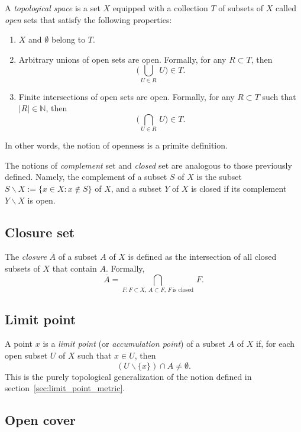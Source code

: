\documentclass[aps,prl,twocolumn,groupedaddress]{revtex4-2}
\newcommand{\NN}{\mathbb{N}}
\begin{document}

A {\em topological space} is a set $X$ equipped with a collection $T$ of subsets of $X$ called {\em open} sets that satisfy the following properties:
\begin{enumerate}
\item
$X$ and $\emptyset$ belong to $T$.
\item
Arbitrary unions of open sets are open.
Formally, for any $R\subset T$, then 
$$
\bigg( \bigcup_{U\in R}\, U \bigg) \in T.
$$
\item
Finite intersections of open sets are open.
Formally, for any $R\subset T$ such that $|R|\in \NN$, then
$$
\bigg( \bigcap_{U\in R}\, U \bigg) \in T.
$$
\end{enumerate}
In other words, the notion of openness is a primite definition.

The notions of {\em complement} set and {\em closed} set are analogous to those previously defined.
Namely, the complement of a subset $S$ of $X$ is the subset $S\backslash X := \{x\in X:x\notin S\}$ of $X$, and a subset $Y$ of $X$ is closed if its complement $Y\backslash X$ is open.

\subsection{Closure set}

The {\em closure} $\overline{A}$ of a subset $A$ of $X$ is defined as the intersection of all closed subsets of $X$ that contain $A$.
Formally,
$$
\overline{A}
=
\bigcap_{F:F\subset X,\,A\subset F,\,F\, \text{is closed}}\,F.
$$

\subsection{Limit point}

A point $x$ is a {\em limit point} (or {\em accumulation point}) of a subset $A$ of $X$ if, for each open subset $U$ of $X$ such that $x\in U$, then
$$
(U\backslash \{x\})\cap A \neq \emptyset.
$$
This is the purely topological generalization of the notion defined in section~\ref{sec:limit_point_metric}.

\subsection{Open cover}
\end{document}
